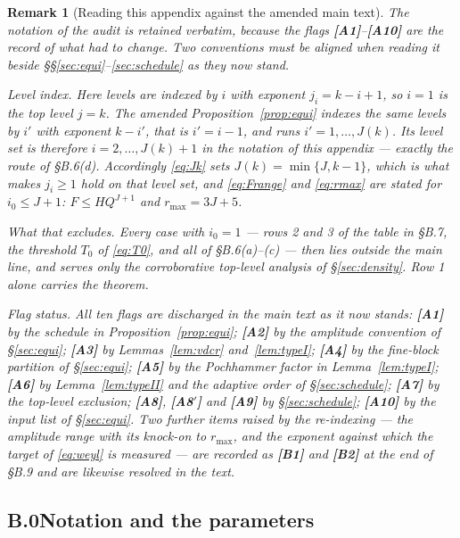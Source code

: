 \documentclass[11pt]{article}
\newtheorem{remark}[theorem]{Remark}
\theoremstyle{definition}
\theoremstyle{plain}
\begin{document}
\begin{remark}[Reading this appendix against the amended main text]
\label{rem:bridge}
The notation of the audit is retained verbatim, because the flags
\textbf{[A1]}--\textbf{[A10]} are the record of what had to change.  Two
conventions must be aligned when reading it beside
\S\S\ref{sec:equi}--\ref{sec:schedule} as they now stand.

\emph{Level index.}  Here levels are indexed by $i$ with exponent
$j_{i}=k-i+1$, so $i=1$ is the top level $j=k$.  The amended
Proposition~\ref{prop:equi} indexes the same levels by $i'$ with exponent
$k-i'$, that is $i'=i-1$, and runs $i'=1,\dots,J(k)$.  Its level set is
therefore $i=2,\dots,J(k)+1$ in the notation of this appendix --- exactly
the route of \S B.6(d).  Accordingly \eqref{eq:Jk} sets
$J(k)=\min\{J,k-1\}$, which is what makes $j_{i}\ge1$ hold on that level
set, and \eqref{eq:Frange} and \eqref{eq:rmax} are stated for
$i_{0}\le J+1$: $F\le HQ^{J+1}$ and $r_{\max}=3J+5$.

\emph{What that excludes.}  Every case with $i_{0}=1$ --- rows 2 and 3 of
the table in \S B.7, the threshold $T_{0}$ of \eqref{eq:T0}, and all of
\S B.6(a)--(c) --- then lies outside the main line, and serves only the
corroborative top-level analysis of \S\ref{sec:density}.  Row 1 alone
carries the theorem.

\emph{Flag status.}  All ten flags are discharged in the main text as it
now stands: \textbf{[A1]} by the schedule in
Proposition~\ref{prop:equi}; \textbf{[A2]} by the amplitude convention of
\S\ref{sec:equi}; \textbf{[A3]} by Lemmas~\ref{lem:vdcr}
and~\ref{lem:typeI}; \textbf{[A4]} by the fine-block partition of
\S\ref{sec:equi}; \textbf{[A5]} by the Pochhammer factor in
Lemma~\ref{lem:typeI}; \textbf{[A6]} by Lemma~\ref{lem:typeII} and the
adaptive order of \S\ref{sec:schedule}; \textbf{[A7]} by the top-level
exclusion; \textbf{[A8]}, \textbf{[A8$'$]} and \textbf{[A9]} by
\S\ref{sec:schedule}; \textbf{[A10]} by the input list of
\S\ref{sec:equi}.  Two further items raised by the re-indexing ---
the amplitude range with its knock-on to $r_{\max}$, and the exponent
against which the target of \eqref{eq:weyl} is measured --- are recorded
as \textbf{[B1]} and \textbf{[B2]} at the end of \S B.9 and are likewise
resolved in the text.
\end{remark}

\subsection*{B.0\quad Notation and the parameters}
\end{document}
